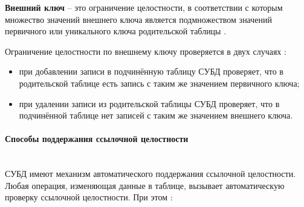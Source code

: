 \begin{grayquote}
    \textbf{Внешний ключ} – это ограничение целостности, в соответствии с которым множество значений внешнего ключа является подмножеством значений первичного или уникального ключа родительской таблицы \autocite{Karpova2009}.
\end{grayquote}

Ограничение целостности по внешнему ключу проверяется в двух случаях \autocite{Karpova2009}:

\begin{itemize}
    \item при добавлении записи в подчинённую таблицу СУБД проверяет, что в родительской таблице есть запись с таким же значением первичного ключа;
    \item при удалении записи из родительской таблицы СУБД проверяет, что в подчинённой таблице нет записей с таким же значением внешнего ключа.
\end{itemize}

\paragraph{Способы поддержания ссылочной целостности} ~\\
СУБД имеют механизм автоматического поддержания ссылочной целостности. Любая операция, изменяющая данные в таблице, вызывает автоматическую проверку ссылочной целостности. При этом \autocite{WikiLink}:

